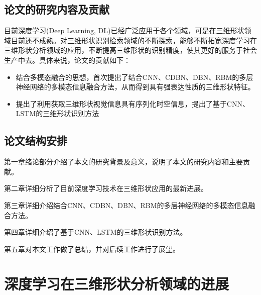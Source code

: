 \documentclass[twoside,UTF8]{nputhesis}
\begin{document}
\section{论文的研究内容及贡献}
目前深度学习(Deep Learning, DL)已经广泛应用于各个领域，可是在三维形状领域目前还不成熟。对三维形状识别检索领域的不断探索，能够不断拓宽深度学习在三维形状分析领域的应用，不断提高三维形状的识别精度，使其更好的服务于社会生产中去。具体来说，论文的贡献如下：

\begin{itemize}
\item 结合多模态融合的思想，首次提出了结合CNN、CDBN、DBN、RBM的多层神经网络的多模态信息融合方法，从而得到具有强表达性质的三维形状特征。
\item 提出了利用获取三维形状视觉信息具有序列化时空信息，提出了基于CNN、LSTM的三维形状识别方法
\end{itemize} 

\section{论文结构安排}

第一章绪论部分介绍了本文的研究背景及意义，说明了本文的研究内容和主要贡献。

第二章详细分析了目前深度学习技术在三维形状应用的最新进展。

第三章详细介绍结合CNN、CDBN、DBN、RBM的多层神经网络的多模态信息融合方法。

第四章详细介绍了基于CNN、LSTM的三维形状识别方法。

第五章对本文工作做了总结，并对后续工作进行了展望。




\chapter{深度学习在三维形状分析领域的进展}
\end{document}
